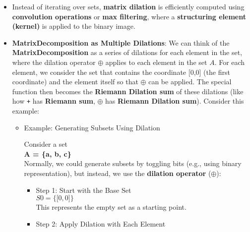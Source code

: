 \documentclass[11pt]{amsart}
\theoremstyle{remark}
\theoremstyle{definition}
\theoremstyle{remark}
\numberwithin{equation}{section}
\begin{document}
\begin{itemize}
\item
  Instead of iterating over sets, \textbf{matrix dilation} is
  efficiently computed using \textbf{convolution operations} or
  \textbf{max filtering}, where a \textbf{structuring element (kernel)}
  is applied to the binary image.
\item
  \textbf{MatrixDecomposition as Multiple Dilations}: We can think of
  the \textbf{MatrixDecomposition} as a series of dilations for each
  element in the set, where the dilation operator $\oplus$ applies to each
  element in the set $A$. For each element, we consider the set that
  contains the coordinate {[}0,0{]} (the first coordinate) and the
  element itself so that $\oplus$ can be applied. The special function then
  becomes the \textbf{Riemann Dilation sum} of these dilations (like how
  \texttt{+} has \textbf{Riemann sum}, $\oplus$ has \textbf{Riemann Dilation
  sum}). Consider this example:

  \begin{itemize}
  \item
    Example: Generating Subsets Using Dilation

    Consider a set\\
    \textbf{A = \{a, b, c\}}\\
    Normally, we could generate subsets by toggling bits (e.g., using
    binary representation), but instead, we use the \textbf{dilation
    operator} ($\oplus$):

    \begin{itemize}
    \item
      Step 1: Start with the Base Set\\
      ${S0} = \{{[}0,0{]}\}$\\
      This represents the empty set as a starting point.
    \item
      Step 2: Apply Dilation with Each Element


\end{itemize}
\end{itemize}
\end{itemize}
\end{document}
